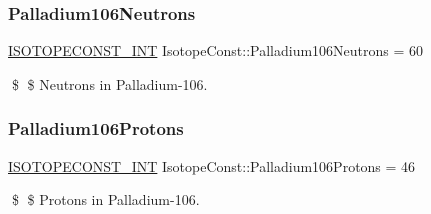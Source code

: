 \subsubsection{\texorpdfstring{Palladium106\+Neutrons}{Palladium106Neutrons}}
{\footnotesize\ttfamily \mbox{\hyperlink{group___isotope_const-_macros_ga5f18360b3e99483a35c32d789e62621c}{I\+S\+O\+T\+O\+P\+E\+C\+O\+N\+S\+T\+\_\+\+I\+NT}} Isotope\+Const\+::\+Palladium106\+Neutrons = 60}

\$ \$ Neutrons in Palladium-\/106. \mbox{\label{group___isotope_const-_palladium-_pd106_gafbc214dda69d446f71e97bc07b8ced5a}} 
\subsubsection{\texorpdfstring{Palladium106\+Protons}{Palladium106Protons}}
{\footnotesize\ttfamily \mbox{\hyperlink{group___isotope_const-_macros_ga5f18360b3e99483a35c32d789e62621c}{I\+S\+O\+T\+O\+P\+E\+C\+O\+N\+S\+T\+\_\+\+I\+NT}} Isotope\+Const\+::\+Palladium106\+Protons = 46}

\$ \$ Protons in Palladium-\/106. 
